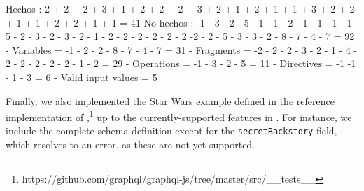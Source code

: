 	Hechos : 2 + 2 + 2 + 3 + 1 + 2 + 2 + 2 + 3 + 2 + 1 + 2  + 1 + 1 + 3 + 2 + 2 + 1 + 1 + 2 + 2 + 1 + 1 = 41
	No hechos : -1 - 3 - 2 - 5 - 1 - 1 - 2 - 1 - 1 - 1 - 1 - 5 - 2 - 3 - 2 - 3 - 2  - 1 - 2 - 2 - 2 - 2 - 2 - 2 -2 - 2 - 5 - 3 - 3 - 2 - 8 - 7 - 4 - 7  = 92
	- Variables = -1 - 2 - 2 - 8 - 7 - 4 - 7 = 31
	- Fragments = -2 - 2 - 2 - 3 - 2 - 1 - 4 - 2 - 2 - 2 - 2 - 2 - 1 - 2 = 29 
	- Operations = -1 - 3 - 2 - 5 = 11
	- Directives = -1 -1 - 1 - 3 = 6
	- Valid input values = 5
\fi 
	
Finally, we also implemented the Star Wars example defined in the reference implementation of \gql,\footnote{https://github.com/graphql/graphql-js/tree/master/src/\_\_tests\_\_} up to the currently-supported features in \gcoql.
For instance, we include the complete schema definition except for the \texttt{secretBackstory} field, which resolves to an error, as these are not yet supported. 


		



\endinput
Intro to section

\et{I suggest to split this section in two parts: one that is related to the core (schema, data model, queries, semantics), and on that is related to normalization/simplified semantics. And to move the first to just after section 3 (either as a 3.5 or as a separate section 4 if it's length justifies it)}

